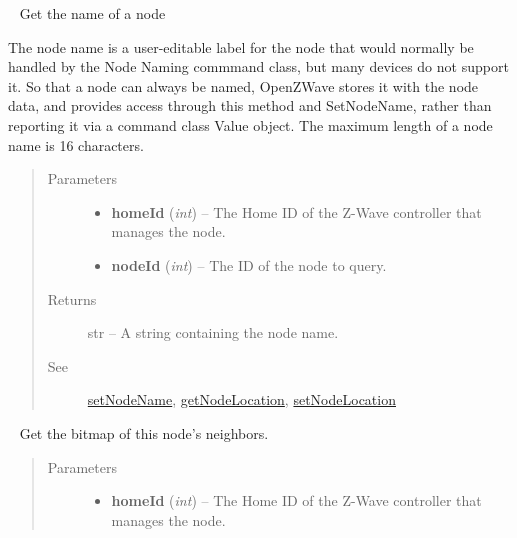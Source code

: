 \documentclass[letterpaper,10pt,english]{sphinxmanual}
\begin{document}
\begin{fulllineitems}

\begin{fulllineitems}
\label{libopenzwave:libopenzwave.PyManager.getNodeName}~\label{libopenzwave:getnodename}
Get the name of a node

The node name is a user-editable label for the node that would normally be
handled by the Node Naming commmand class, but many devices do not support it.
So that a node can always be named, OpenZWave stores it with the node data, and
provides access through this method and SetNodeName, rather than reporting it
via a command class Value object.  The maximum length of a node name is 16
characters.
\begin{quote}\begin{description}
\item[{Parameters}] \leavevmode\begin{itemize}
\item {} 
\textbf{homeId} (\emph{int}) -- The Home ID of the Z-Wave controller that manages the node.

\item {} 
\textbf{nodeId} (\emph{int}) -- The ID of the node to query.

\end{itemize}

\item[{Returns}] \leavevmode
str -- A string containing the node name.

\item[{See}] \leavevmode
{\hyperref[libopenzwave:setnodename]{setNodeName}}, {\hyperref[libopenzwave:getnodelocation]{getNodeLocation}}, {\hyperref[libopenzwave:setnodelocation]{setNodeLocation}}

\end{description}\end{quote}

\end{fulllineitems}


\begin{fulllineitems}
\label{libopenzwave:libopenzwave.PyManager.getNodeNeighbors}~\label{libopenzwave:getnodeneighbors}
Get the bitmap of this node's neighbors.
\begin{quote}\begin{description}
\item[{Parameters}] \leavevmode\begin{itemize}
\item {} 
\textbf{homeId} (\emph{int}) -- The Home ID of the Z-Wave controller that manages the node.


\end{itemize}
\end{description}
\end{quote}
\end{fulllineitems}
\end{fulllineitems}
\end{document}
